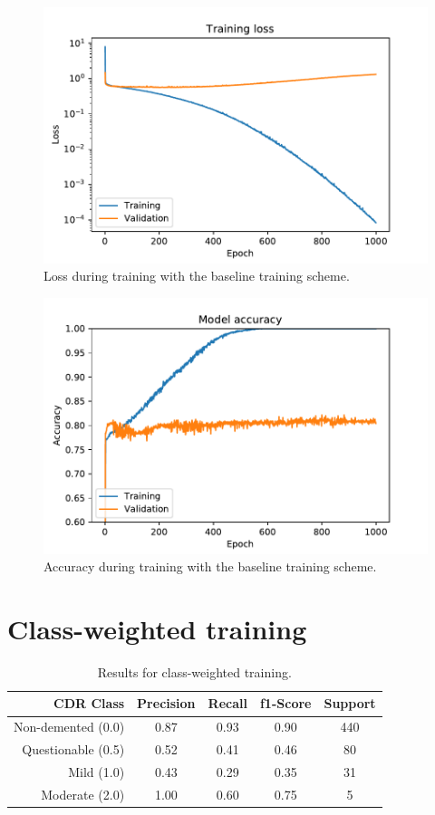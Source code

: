 \documentclass{kththesis}
\begin{document}
\begin{figure}[H]
  \centering
  \includegraphics[width=0.9\linewidth]{img/loss_default.pdf}
  \caption{Loss during training with the baseline training scheme.} \label{fig:loss_default}
\end{figure}
\begin{figure}[H]
  \centering
  \includegraphics[width=0.9\linewidth]{img/accuracy_default.pdf}
  \caption{Accuracy during training with the baseline training scheme.} \label{fig:accuracy_default}
\end{figure}


\section{Class-weighted training}
\begin{table}[H]
  \begin{center}
    \caption{Results for class-weighted training. \label{tab:results_class_weighted}}
    \begin{tabular}{r|ccc|c}
      \textbf{CDR Class} & \textbf{Precision} & \textbf{Recall} & \textbf{f1-Score} & \textbf{Support} \\
      \toprule
      Non-demented (0.0) & 0.87 & 0.93 & 0.90 & 440 \\
      Questionable (0.5) & 0.52 & 0.41 & 0.46 & 80  \\
      Mild (1.0)         & 0.43 & 0.29 & 0.35 & 31  \\
      Moderate (2.0)     & 1.00 & 0.60 & 0.75 & 5   \\
    \end{tabular}
  \end{center}
\end{table}
\end{document}
